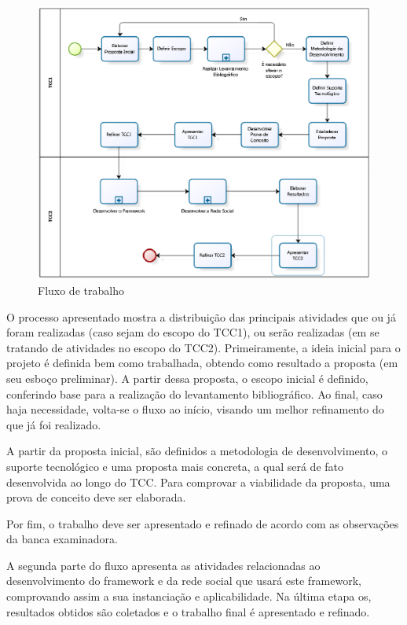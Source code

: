 \begin{figure}[h]
	\centering
	\includegraphics[scale=0.6]{figuras/capitulo4/processo_tcc.eps}
	\caption{Fluxo de trabalho}
	\label{processo tcc}
\end{figure}

O processo apresentado mostra a distribuição das principais atividades que ou já foram realizadas (caso sejam do escopo do TCC1), ou serão realizadas (em se tratando de atividades no escopo do TCC2). Primeiramente, a ideia inicial para o projeto é definida bem como trabalhada, obtendo como resultado a proposta (em seu esboço preliminar). A partir dessa proposta, o escopo inicial é definido, conferindo base para a realização do levantamento bibliográfico. Ao final, caso haja necessidade, volta-se o fluxo ao início, visando um melhor refinamento do que já foi realizado.

A partir da proposta inicial, são definidos a metodologia de desenvolvimento, o suporte tecnológico e uma proposta mais concreta, a qual será de fato desenvolvida ao longo do TCC. Para comprovar a viabilidade da proposta, uma prova de conceito deve ser elaborada.

Por fim, o trabalho deve ser apresentado e refinado de acordo com as observações da banca examinadora.

A segunda parte do fluxo apresenta as atividades relacionadas ao desenvolvimento do framework e da rede social que usará este framework, comprovando assim a sua instanciação e aplicabilidade. Na última etapa os, resultados obtidos são coletados e o trabalho final é apresentado e refinado.

